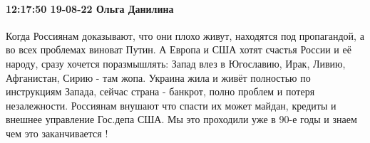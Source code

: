 \paragraph{12:17:50 19-08-22 Ольга Данилина}

Когда Россиянам доказывают, что они плохо живут, находятся под пропагандой, а
во всех проблемах виноват Путин. А Европа и США хотят счастья России и её
народу, сразу хочется поразмышлять: Запад влез в Югославию, Ирак, Ливию,
Афганистан, Сирию - там жопа. Украина жила и живёт полностью по инструкциям
Запада, сейчас страна - банкрот, полно проблем и потеря незалежности. Россиянам
внушают что спасти их может майдан, кредиты и внешнее управление Гос.депа США.
Мы это проходили уже в 90-е годы и знаем чем это заканчивается !

